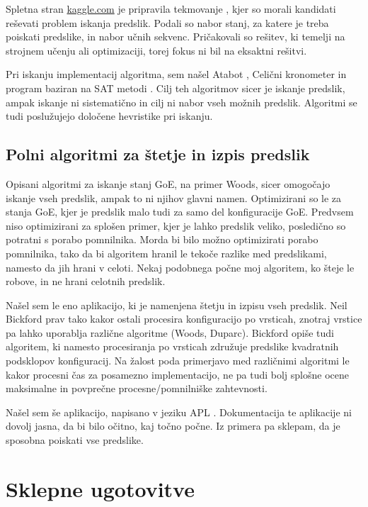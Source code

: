 \documentclass[12pt,a4paper,openany,twoside]{book}
\begin{document}
Spletna stran \url{kaggle.com} je pripravila tekmovanje \cite{kaggle2013},
kjer so morali kandidati reševati problem iskanja predslik. Podali so
nabor stanj, za katere je treba poiskati predslike, in nabor učnih sekvenc.
Pričakovali so rešitev, ki temelji na strojnem učenju ali optimizaciji,
torej fokus ni bil na eksaktni rešitvi.

Pri iskanju implementacij algoritma, sem našel Atabot \cite{Borah2013},
Celični kronometer \cite{Duxbury2013} in program baziran na SAT metodi \cite{Pigorsch2015}.
Cilj teh algoritmov sicer je iskanje predslik, ampak iskanje ni sistematično
in cilj ni nabor vseh možnih predslik.
Algoritmi se tudi poslužujejo določene hevristike pri iskanju.

\section{Polni algoritmi za štetje in izpis predslik}

Opisani algoritmi za iskanje stanj GoE, na primer Woods,
sicer omogočajo iskanje vseh predslik, ampak to ni njihov glavni namen.
Optimizirani so le za stanja GoE, kjer je predslik malo tudi za samo del konfiguracije GoE.
Predvsem niso optimizirani za splošen primer, kjer je lahko predslik veliko,
posledično so potratni s porabo pomnilnika.
Morda bi bilo možno optimizirati porabo pomnilnika,
tako da bi algoritem hranil le tekoče razlike med predslikami, namesto da jih hrani v celoti.
Nekaj podobnega počne moj algoritem, ko šteje le robove, in ne hrani celotnih predslik.

Našel sem le eno aplikacijo, ki je namenjena štetju in izpisu vseh predslik.
Neil Bickford \cite{Bickford2012} prav tako kakor ostali procesira konfiguracijo
po vrsticah, znotraj vrstice pa lahko uporablja različne algoritme (Woods, Duparc).
Bickford opiše tudi algoritem, ki namesto procesiranja po vrsticah združuje predslike
kvadratnih podsklopov konfiguracij. Na žalost poda primerjavo med različnimi algoritmi
le kakor procesni čas za posamezno implementacijo, ne pa tudi bolj splošne
ocene maksimalne in povprečne procesne/pomnilniške zahtevnosti.

Našel sem še aplikacijo, napisano v jeziku APL \cite{ionreq2013}.
Dokumentacija te aplikacije ni dovolj jasna, da bi bilo očitno, kaj točno počne.
Iz primera pa sklepam, da je sposobna poiskati vse predslike.

\chapter{Sklepne ugotovitve}
\end{document}
